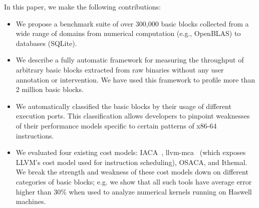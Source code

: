 In this paper, we make the following contributions:
\begin{itemize}
\item We propose a benchmark suite of over 300,000 basic blocks collected from a wide range of domains from numerical computation (e.g., OpenBLAS) to databases (SQLite).

\item We describe a fully automatic framework
for measuring the throughput of arbitrary basic blocks extracted 
from raw binaries without any user annotation or intervention.
We have used this framework to profile more than 2 million basic blocks.

\item We automatically classified the basic blocks
by their usage of different execution ports.
This classification allows developers to pinpoint weaknesses
of their performance models specific to certain patterns of x86-64 instructions.

\item We evaluated four existing cost models:
IACA~\cite{iaca}, llvm-mca~\cite{llvm-mca} (which exposes LLVM’s cost model used for instruction scheduling),
OSACA\cite{osaca}, and Ithemal\cite{ithemal}.
We break the strength and weakness of these cost models down on
different categories of basic blocks;
e.g. we show that all such tools
have average error higher than 30\% 
when used to analyze numerical kernels running on Haswell machines.

\end{itemize}